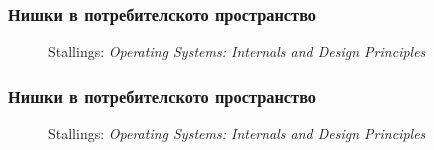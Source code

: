 \documentclass[ignorenonframetext, hyperref=unicode]{beamer}
\begin{document}
\begin{frame}\frametitle{Нишки в потребителското пространство}
\begin{figure}[h]
\center
{}
\caption{Stallings: {\em Operating Systems: Internals and Design Principles}}
\end{figure}
\end{frame}

\begin{frame}\frametitle{Нишки в потребителското пространство}
\begin{figure}[h]
\center
{}
\caption{Stallings: {\em Operating Systems: Internals and Design Principles}}
\end{figure}
\end{frame}
\end{document}
